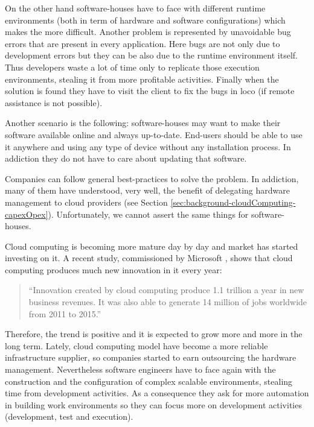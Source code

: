 On the other hand software-houses have to face with different runtime environments (both in term of
hardware and software configurations) which makes the  more difficult.
Another problem is represented by unavoidable bug errors that are present in every application. Here
bugs are not only due to development errors but they can be also due to the runtime environment itself.
Thus developers waste a lot of time only to replicate those execution environments, stealing it from
more profitable activities. Finally when the solution is found they have to visit the client to fix
the bugs in loco (if remote assistance is not possible).

Another scenario is the following: software-houses may want to make their software available online
and always up-to-date. End-users should be able to use it anywhere and using any type of device without
any installation process. In addiction they do not have to care about updating that software.

Companies can follow general best-practices to solve the problem. In addiction, many of them have
understood, very well, the benefit of delegating hardware management to cloud providers (see Section
\ref{sec:background-cloudComputing-capexOpex}). Unfortunately, we cannot assert the same things for
software-houses.

Cloud computing is becoming more mature day by day and market has started investing on it. A recent
study, commissioned by Microsoft \cite{microsftCloudNewJob}, shows that cloud computing produces much
new innovation in \acs{it} every year:

\begin{center}
	\begin{quote}
		``Innovation created by cloud computing produce \textdollar{}1.1 trillion a year in new
		business revenues. It was also able to generate 14 million of jobs worldwide from 2011 to 2015.''
	\end{quote}
\end{center}

Therefore, the trend is positive and it is expected to grow more and more in the long term.
Lately, cloud computing model have become a more reliable infrastructure supplier, so companies 
started to earn outsourcing the hardware management. Nevertheless software engineers have to face
again with the construction and the configuration of complex scalable environments, stealing time from
development activities. As a consequence they ask for more automation in building work environments so
they can focus more on development activities (development, test and execution).

